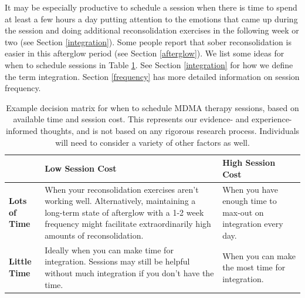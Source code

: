 \documentclass[12pt,letterpaper]{book}
\begin{document}
It may be especially productive to schedule a session when there is time to spend at least a few hours a day putting attention to the emotions that came up during the session and doing additional reconsolidation exercises in the following week or two (see Section \ref{integration}). Some people report that sober reconsolidation is easier in this afterglow period (see Section \ref{afterglow}). We list some ideas for when to schedule sessions in Table \ref{sessionDecision}. See Section \ref{integration} for how we define the term integration. Section \ref{frequency} has more detailed information on session frequency.
\FloatBarrier
\begin{table}[h]
\caption{Example decision matrix for when to schedule MDMA therapy sessions, based on available time and session cost. This represents our evidence- and experience-informed thoughts, and is not based on any rigorous research process. Individuals will need to consider a variety of other factors as well.}
\label{sessionDecision}
\centering
\begin{tabular}{|p{2.7cm}|p{6.15cm}|p{6.15cm}|}
    \hline
    & \centering\textbf{Low Session Cost} & \centering\textbf{High Session Cost} \tabularnewline
    \hline
    \centering\textbf{Lots of Time} & 
    \centering When your reconsolidation exercises aren't working well. Alternatively, maintaining a long-term state of afterglow with a 1-2 week frequency might facilitate extraordinarily high amounts of reconsolidation\footnotemark. & 
    \centering When you have enough time to max-out on integration every day. \tabularnewline
    \hline
    \centering\textbf{Little Time} & 
    \centering Ideally when you can make time for integration. Sessions may still be helpful without much integration if you don't have the time. & 
    \centering When you can make the most time for integration. \tabularnewline
    \hline
\end{tabular}
\end{table}
\FloatBarrier
{}
\end{document}
